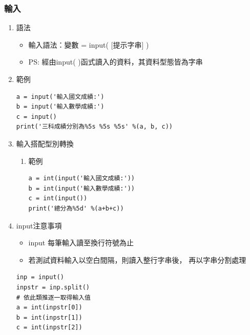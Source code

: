 \documentclass[a4paper,12pt]{article}
\begin{document}
\subsubsection{輸入}
\label{sec:org4801b6a}
\begin{enumerate}
\item 語法
\label{sec:orged74e33}
\begin{itemize}
\item 輸入語法：變數 = input( [提示字串] ) \\
\item PS: 經由input( )函式讀入的資料，其資料型態皆為字串\\
\end{itemize}

\item 範例
\label{sec:orgd83b110}
\lstset{breaklines=true,language=Python,label= ,caption= ,captionpos=b,firstnumber=1,numbers=left}
\begin{lstlisting}
a = input('輸入國文成績:')
b = input('輸入數學成績:')
c = input()
print('三科成績分別為%5s %5s %5s' %(a, b, c))
\end{lstlisting}

\item 輸入搭配型別轉換
\label{sec:org61b12f5}
\begin{enumerate}
\item 範例
\label{sec:orgc112a56}
\lstset{breaklines=true,language=Python,label= ,caption= ,captionpos=b,firstnumber=1,numbers=left}
\begin{lstlisting}
a = int(input('輸入國文成績:'))
b = int(input('輸入數學成績:'))
c = int(input())
print('總分為%5d' %(a+b+c))
\end{lstlisting}
\end{enumerate}

\item input注意事項
\label{sec:orgeb00edd}
\begin{itemize}
\item input 每筆輸入讀至換行符號為止\\
\item 若測試資料輸入以空白間隔，則讀入整行字串後， 再以字串分割處理\\
\end{itemize}
\lstset{breaklines=true,language=Python,label= ,caption= ,captionpos=b,firstnumber=1,numbers=left}
\begin{lstlisting}
inp = input()
inpstr = inp.split()
# 依此類推逐一取得輸入值
a = int(inpstr[0])
b = int(inpstr[1])
c = int(inpstr[2])
\end{lstlisting}
\end{enumerate}
\end{document}

